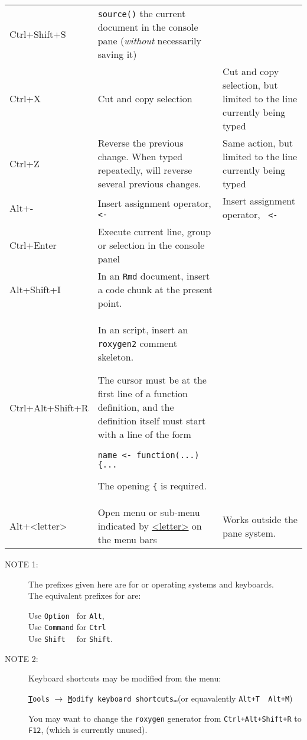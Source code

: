 \documentclass[11pt]{article}
\begin{document}
\begin{xltabular}{1.0\linewidth}[!htp]{@{}lXX@{}}
  Ctrl+Shift+S & \texttt{source()} the current document  in
  the console pane (\emph{without} necessarily saving it)& \\
  Ctrl+X & Cut and copy selection & Cut and copy selection, but
  limited to the  line currently being typed\\
  Ctrl+Z & Reverse the previous change.  When typed repeatedly, will
  reverse several previous changes. & Same action, but limited to the
  line currently being typed\\
  Alt+- & Insert assignment operator, \texttt{ <- } & Insert
  assignment operator, \texttt{ <- }\\
  Ctrl+Enter & Execute current line, group or selection in the console
  panel & \\
  Alt+Shift+I & In an \texttt{Rmd} document, insert a code chunk at
  the present  point. & \\
  Ctrl+Alt+Shift+R & In an \R script, insert an \texttt{roxygen2}
  comment skeleton.\par
  The cursor must be at the first line of a function definition, and
  the definition itself must start with a line of the form\par
  \texttt{name <- function(...) \{...}\par
  The opening \texttt{\{} is required.&\\
  \midrule Alt+<letter> & Open menu or sub-menu indicated by
  \underline{<letter>} on the menu bars& Works outside
  the pane system.\\
  \bottomrule
\end{xltabular}

\begin{footnotesize}
\begin{description}
\item[NOTE 1:] The prefixes given here are for \Windows or \Linux
  operating systems and keyboards.\\
  The equivalent prefixes for \MacOS are:

  Use \verb|Option | for \verb|Alt|,\\
  Use \verb|Command| for \verb|Ctrl|\\
  Use \verb|Shift  | for \verb|Shift|.
\item[NOTE 2:] Keyboard shortcuts may be modified from the menu:
  \begin{center}
    \texttt{\underline{T}ools} $\longrightarrow$ \texttt{\underline{M}odify keyboard shortcuts\dots}\quad (or
    equavalently \verb|Alt+T  Alt+M|)
  \end{center}
  You may want to change the \texttt{roxygen} generator from
  \verb|Ctrl+Alt+Shift+R| to \verb|F12|, (which is currently unused). 
\end{description}
\end{footnotesize}
\end{document}
